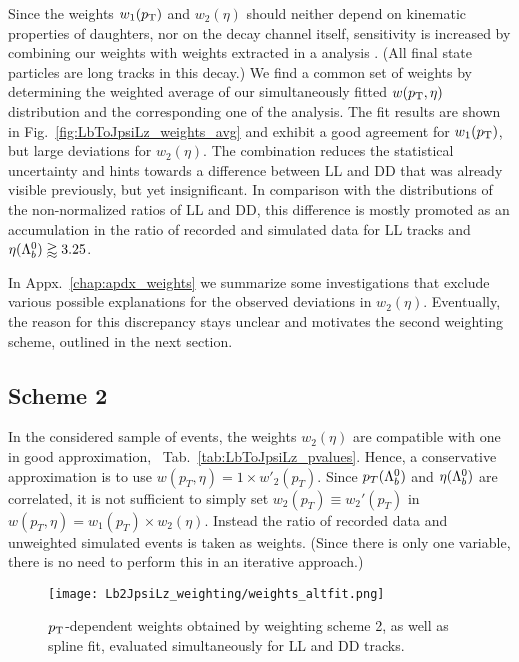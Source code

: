 Since the weights $w_1(\mbox{$p_{\mathrm{ T}}$})$ and $w_2(\eta)$ should neither depend on kinematic properties of \Lb daughters, nor on the decay channel itself, sensitivity is increased by combining our weights with weights extracted in a \decay{\Lb}{\Dz\proton\pim} analysis \cite{hviemann}.
(All final state particles are long tracks in this decay.)
We find a common set of weights by determining the weighted average of our simultaneously fitted $w(\mbox{$p_{\mathrm{ T}}$}, \eta)$ distribution and the corresponding one of the \decay{\Lb}{\Dz\proton\pim} analysis.
The fit results are shown in Fig.~\ref{fig:LbToJpsiLz_weights_avg} and exhibit a good agreement for $w_1(\mbox{$p_{\mathrm{ T}}$})$, but large deviations for $w_2(\eta)$.
The combination reduces the statistical uncertainty and hints towards a difference between \gls{LL} and \gls{DD} that was already visible previously, but yet insignificant.
In comparison with the distributions of the non-normalized ratios of \gls{LL} and \gls{DD}, this difference is mostly promoted as an accumulation in the ratio of recorded and simulated data for \gls{LL} tracks and $\eta({{\Lambda}^0_{b}}) \gtrapprox 3.25$.

In Appx.~\ref{chap:apdx_weights} we summarize some investigations that exclude various possible explanations for the observed deviations in $w_2(\eta)$.
Eventually, the reason for this discrepancy stays unclear and motivates the second weighting scheme, outlined in the next section.

\subsection{Scheme 2}
\label{sec:LbToJpsiLz_w2}
In the considered sample of \decay{\Lb}{\jpsi\Lz} events, the weights $w_2(\eta)$ are compatible with one in good approximation, \cf{}~Tab.~\ref{tab:LbToJpsiLz_pvalues}.
Hence, a conservative approximation is to use $w(p_T, \eta) = 1 \times w'_2(p_T)$.
Since $p_T({{\Lambda}^0_{b}})$ and $\eta({{\Lambda}^0_{b}})$ are correlated, it is not sufficient to simply set $w_2(p_T) \equiv w_2'(p_T)$ in $w(p_T, \eta) = w_1(p_T) \times w_2(\eta)$.
Instead the ratio of recorded data and unweighted simulated events is taken as weights.
(Since there is only one variable, there is no need to perform this in an iterative approach.)

\begin{figure}[htbp]
    \centering
    \texttt{[image: Lb2JpsiLz\_weighting/weights\_altfit.png]}
    \caption{$\mbox{$p_{\mathrm{ T}}$}$-dependent weights obtained by weighting scheme 2, as well as spline fit, evaluated simultaneously for \gls{LL} and \gls{DD} tracks.}
    \label{fig:LbToJpsiLz_weights_altfit}
\end{figure}

